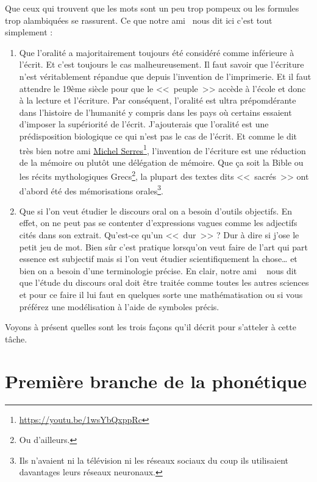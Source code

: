 Que ceux qui trouvent que les mots sont un peu trop pompeux ou les
formules trop alambiquées se rassurent. Ce que notre ami~\cite{lodge} nous
dit ici c'est tout simplement :
\begin{enumerate}
\item Que l'oralité a majoritairement toujours été considéré comme
  inférieure à l'écrit. Et c'est toujours le cas malheureusement. Il
  faut savoir que l'écriture n'est véritablement répandue que depuis
  l'invention de l'imprimerie. Et il faut attendre le 19ème siècle
  pour que le <<~peuple~>> accède à l'école et donc à la lecture et
  l'écriture. Par conséquent, l'oralité est ultra prépomdérante dans
  l'histoire de l'humanité y compris dans les pays où certains
  essaient d'imposer la supériorité de l'écrit. J'ajouterais que
  l'oralité est une prédisposition biologique ce qui n'est pas le cas
  de l'écrit. Et comme le dit très bien notre ami \href{https://youtu.be/1wsYbQxppRc}{Michel Serres}\footnote{\url{https://youtu.be/1wsYbQxppRc}},
  l'invention de l'écriture est une réduction de la mémoire ou plutôt
  une délégation de mémoire. Que ça soit la Bible ou les récits
  mythologiques Grecs\footnote{Ou d'ailleurs.}, la plupart des textes
  dits <<~sacrés~>> ont d'abord été des mémorisations
  orales\footnote{Ils n'avaient ni la télévision ni les réseaux
    sociaux du coup ils utilisaient davantages leurs réseaux
    neuronaux.}.
\item Que si l'on veut étudier le discours oral on a besoin d'outils
  objectifs. En effet, on ne peut pas se contenter d'expressions
  vagues comme les adjectifs cités dans son extrait. Qu'est-ce qu'un
  \son <<~dur~>> ? Dur à dire si j'ose le petit jeu de mot. Bien sûr
  c'est pratique lorsqu'on veut faire de l'art qui part essence est
  subjectif mais si l'on veut étudier scientifiquement la chose\dots{}
  et bien on a besoin d'une terminologie précise. En clair, notre ami
 ~\cite{lodge} nous dit que l'étude du discours oral doit être traitée comme
  toutes les autres sciences et pour ce faire il lui faut en quelques
  sorte une mathématisation ou si vous préférez une modélisation à
  l'aide de symboles précis.
\end{enumerate}

Voyons à présent quelles sont les trois façons qu'il décrit pour
s'atteler à cette tâche.

\newpage

\section{Première branche de la phonétique}\label{sec:phon-t1}

